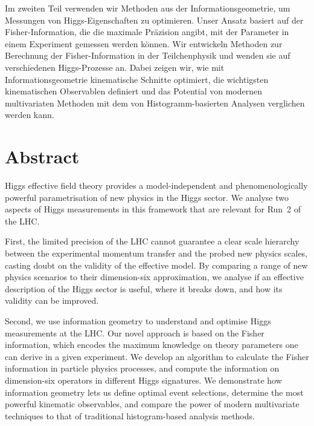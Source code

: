 Im zweiten Teil verwenden wir Methoden aus der Informationsgeometrie,
um Messungen von Higgs-Eigenschaften zu optimieren. Unser Ansatz
basiert auf der Fisher-Information, die die maximale Pr\"azision
angibt, mit der Parameter in einem Experiment gemessen werden
k\"onnen. Wir entwickeln Methoden zur Berechnung der
Fisher-Information in der Teilchenphysik und wenden sie auf
verschiedenen Higgs-Prozesse an. Dabei zeigen wir, wie mit
Informationsgeometrie kinematische Schnitte optimiert, die
wichtigsten kinematischen Observablen definiert und das Potential
von modernen multivariaten Methoden mit dem von Histogramm-basierten
Analysen verglichen werden kann.




\chapter*{Abstract}


Higgs effective field theory provides a model-independent and
phenomenologically powerful parametrisation of new physics in the
Higgs sector. We analyse two aspects of Higgs measurements in this
framework that are relevant for Run~2 of the LHC.

First, the limited precision of the LHC cannot guarantee a clear scale
hierarchy between the experimental momentum transfer and the probed
new physics scales, casting doubt on the validity of the effective
model. By comparing a range of new physics scenarios to their
dimension-six approximation, we analyse if an effective description
of the Higgs sector is useful, where it breaks down, and how its
validity can be improved.

Second, we use information geometry to understand and optimise Higgs
measurements at the LHC. Our novel approach is based on the Fisher
information, which encodes the maximum knowledge on theory parameters
one can derive in a given experiment. We develop an algorithm to
calculate the Fisher information in particle physics processes, and
compute the information on dimension-six operators in different Higgs
signatures.  We demonstrate how information geometry lets us define
optimal event selections, determine the most powerful kinematic
observables, and compare the power of modern multivariate techniques
to that of traditional histogram-based analysis methods.
